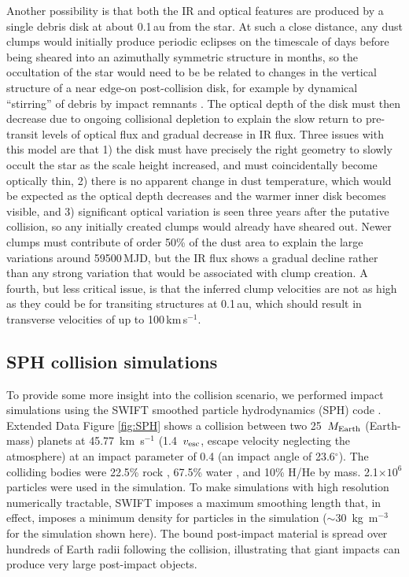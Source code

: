\documentclass[sn-nature,oneside]{sn-jnl}%
\begin{document}
Another possibility is that both the IR and optical features are produced by a single debris disk at about 0.1\,au from the star.
%
At such a close distance, any dust clumps would initially produce periodic eclipses on the timescale of days \citep{2019MNRAS.488.4465G} before being sheared into an azimuthally symmetric structure in months, so the occultation of the star would need to be be related to changes in the vertical structure of a near edge-on post-collision disk, for example by dynamical ``stirring'' of debris by impact remnants \cite{1992Icar...96..107I}.
%
The optical depth of the disk must then decrease due to ongoing collisional depletion to explain the slow return to pre-transit levels of optical flux and gradual decrease in IR flux.
%
Three issues with this model are that 1) the disk must have precisely the right geometry to slowly occult the star as the scale height increased, and must coincidentally become optically thin, 2) there is no apparent change in dust temperature, which would be expected as the optical depth decreases and the warmer inner disk becomes visible, and 3) significant optical variation is seen three years after the putative collision, so any initially created clumps would already have sheared out.
%
Newer clumps must contribute of order 50\% of the dust area to explain the large variations around 59500\,MJD, but the IR flux shows a gradual decline rather than any strong variation that would be associated with clump creation.
%
A fourth, but less critical issue, is that the inferred clump velocities are not as high as they could be for transiting structures at 0.1\,au, which should result in transverse velocities of up to 100\,km\,s$^{-1}$.

\subsection*{SPH collision simulations}

To provide some more insight into the collision scenario, we performed impact simulations using the SWIFT smoothed particle hydrodynamics (SPH) code \cite{Schaller2016,Schaller2018,Kegerreis2019}.
%
Extended Data Figure \ref{fig:SPH} shows a collision between two 25~$M_{\rm Earth}$ (Earth-mass) planets at 45.77~km~s$^{-1}$ (1.4~$v_{\rm esc}$, escape velocity neglecting the atmosphere) at an impact parameter of 0.4 (an impact angle of 23.6$^\circ$).
%
The colliding bodies were 22.5\% rock \cite[forsterite,][]{Stewart2019forsteriteEOS,Stewart2020_key_req_EOS}, 67.5\% water \cite{Senft2008}, and 10\% H/He \cite{Hubbard1980} by mass.
%
2.1$\times10^6$ particles were used in the simulation.
%
To make simulations with high resolution numerically tractable, SWIFT imposes a maximum smoothing length that, in effect, imposes a minimum density for particles in the simulation ($\sim30$~kg~m$^{-3}$ for the simulation shown here). 
%
The bound post-impact material is spread over hundreds of Earth radii following the collision, illustrating that giant impacts can produce very large post-impact objects. 
\end{document}
